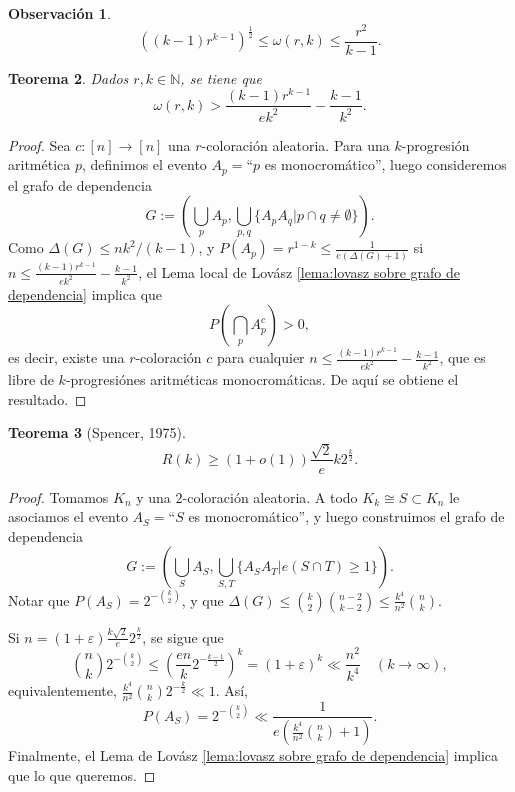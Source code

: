 \documentclass[12pt]{report}
\theoremstyle{plain}
\newtheorem{theorem}{Teorema}[section]
\theoremstyle{definition}
\newtheorem{obs}[theorem]{Observación}
\newcommand{\naturals}{\mathbb{N}}
\begin{document}
\begin{obs}
\[
    \left ( (k-1) r^{k-1} \right )^{\frac 1 2} \leq \omega (r,k) \leq \frac{r^2}{k-1}.
\]
\end{obs}

\begin{theorem}
Dados $r,k \in \naturals$, se tiene que
\[
    \omega (r,k) > \frac{(k-1)r^{k-1}}{e k^2} - \frac {k-1} {k^2}.
\]
\end{theorem}
\begin{proof}
Sea $c : [n] \to [n]$ una $r$-coloración aleatoria. Para una $k$-progresión aritmética $p$, definimos el evento $A_p = $``$p$ es monocromático'', luego consideremos el grafo de dependencia
\[
    G := \left ( \bigcup_{p} A_p , \bigcup_{p, q} \{A_p A_q | p \cap q \neq \emptyset\} \right ).
\]
Como $\Delta (G) \leq nk^2 / (k-1)$, y $P(A_p) = r^{1-k} \leq \frac{1}{e (\Delta (G) +1)}$ si $n \leq \frac{(k-1)r^{k-1}}{e k^2} - \frac {k-1} {k^2}$, el Lema local de Lovász \ref{lema:lovasz sobre grafo de dependencia} implica que
\[
    P(\bigcap_{p} A_p^c) > 0,
\]
es decir, existe una $r$-coloración $c$ para cualquier $n \leq \frac{(k-1)r^{k-1}}{e k^2} - \frac {k-1} {k^2}$, que es libre de $k$-progresiónes aritméticas monocromáticas. De aquí se obtiene el resultado.
\end{proof}

\begin{theorem}[Spencer, 1975]
\[
    R(k) \geq (1 + o(1)) \frac{\sqrt 2}{e} k 2^{\frac k 2}.
\]

\end{theorem}
\begin{proof}
Tomamos $K_n$ y una $2$-coloración aleatoria. A todo $K_k \cong S \subset K_n$ le asociamos el evento $A_S = $``$S$ es monocromático'', y luego construimos el grafo de dependencia
\[
    G:= \left ( \bigcup_S A_S, \bigcup_{S,T} \{A_S A_T | e(S \cap  T) \geq 1\} \right ).
\]
Notar que $P(A_S) = 2^{- \binom k 2}$, y que $\Delta (G) \leq \binom k 2 \binom{n-2}{k-2} \leq \frac{k^4}{n^2}\binom n k$.

Si $n = (1 + \varepsilon) \frac{k \sqrt 2}{e} 2^{\frac k 2}$, se sigue que
\[
    \binom n k 2^{- \binom k 2} \leq \left ( \frac{e n}{k} 2^{- \frac {k-1}2} \right )^k = (1 + \varepsilon)^k \ll \frac{n^2}{k^4} \quad (k \to \infty),
\]
equivalentemente, $\frac{k^4}{n^2} \binom n k 2^{- \frac k 2} \ll 1$.
Así,
\[
    P(A_S) = 2^{- \binom k 2} \ll \frac{1}{e \left ( \frac{k^4}{n^2} \binom n k +  1 \right )}.
\]
Finalmente, el Lema de Lovász \ref{lema:lovasz sobre grafo de dependencia} implica que lo que queremos.
\end{proof}
\end{document}
